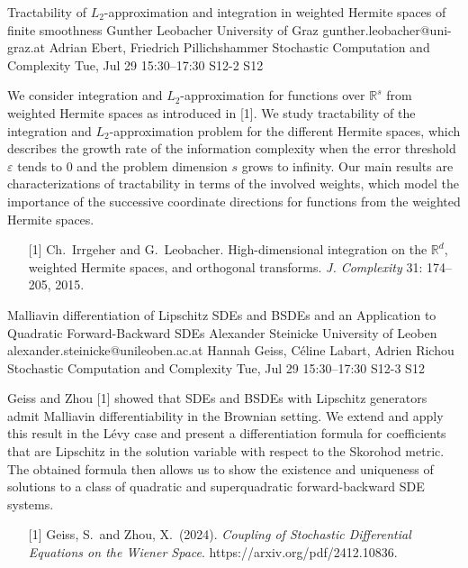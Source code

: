 \begin{talk}
  {Tractability of $L_2$-approximation and integration in weighted Hermite spaces of finite smoothness}%
  {Gunther Leobacher}%
  {University of Graz}%
  {gunther.leobacher@uni-graz.at}%
  {Adrian Ebert, Friedrich Pillichshammer}%
  {Stochastic Computation and Complexity}%
  {Tue, Jul 29 15:30–17:30}%
  {S12-2}%
  {S12}%
				
			

We consider integration and $L_2$-approximation for functions over $\mathbb R^s$ from weighted Hermite spaces as introduced in [1]. We study tractability of the integration and $L_2$-approximation problem for the different Hermite spaces, which describes the growth rate of the information complexity when the error threshold $\varepsilon$ tends to 0 and the problem dimension $s$ grows to infinity. Our main results are characterizations of tractability in terms of the involved weights, which  model the importance of the successive coordinate directions for functions from the weighted Hermite spaces.

\medskip

\begin{enumerate}
	\item[{[1]}] Ch.~Irrgeher and G.~Leobacher. High-dimensional integration on the $\mathbb R^d$, weighted Hermite spaces, and orthogonal transforms. \textit{J. Complexity} 31: 174--205, 2015. 
\end{enumerate}


\end{talk}

\begin{talk}
  {Malliavin differentiation of Lipschitz SDEs and BSDEs and an Application to Quadratic Forward-Backward SDEs}%
  {Alexander Steinicke}%
  {University of Leoben}%
  {alexander.steinicke@unileoben.ac.at}%
  {Hannah Geiss, C\'eline Labart, Adrien Richou}%
  {Stochastic Computation and Complexity}%
  {Tue, Jul 29 15:30–17:30}%
  {S12-3}%
  {S12}%
				
			
Geiss and Zhou [1] showed that SDEs and BSDEs with Lipschitz generators admit Malliavin differentiability in the Brownian setting. We extend and apply this result in the L\'evy case and present a differentiation formula for coefficients that are Lipschitz in the solution variable with respect to the Skorohod metric. The obtained formula then allows us to show the existence and uniqueness of solutions to a class of quadratic and superquadratic forward-backward SDE systems.

\medskip

\begin{enumerate}
	\item[{[1]}] Geiss, S.~and Zhou, X.~(2024). {\it Coupling of Stochastic Differential Equations on the Wiener Space}. https://arxiv.org/pdf/2412.10836.
\end{enumerate}

\end{talk}

